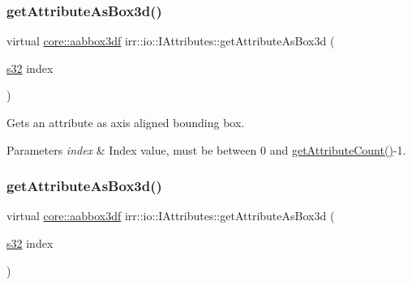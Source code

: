 \subsubsection{\texorpdfstring{get\+Attribute\+As\+Box3d()}{getAttributeAsBox3d()}\hspace{0.1cm}{\footnotesize\ttfamily [3/4]}}
{\footnotesize\ttfamily virtual \hyperlink{namespaceirr_1_1core_a60f4b4c744aba55f10530d503c6ecb04}{core\+::aabbox3df} irr\+::io\+::\+I\+Attributes\+::get\+Attribute\+As\+Box3d (\begin{DoxyParamCaption}\item[{\hyperlink{namespaceirr_ac66849b7a6ed16e30ebede579f9b47c6}{s32}}]{index }\end{DoxyParamCaption})\hspace{0.3cm}{\ttfamily [pure virtual]}}



Gets an attribute as axis aligned bounding box. 


\begin{DoxyParams}{Parameters}
{\em index} & Index value, must be between 0 and \hyperlink{classirr_1_1io_1_1IAttributes_a796bdd9440ee7ba0b6742a90a82870b6}{get\+Attribute\+Count()}-\/1. \\
\hline
\end{DoxyParams}
\mbox{\label{classirr_1_1io_1_1IAttributes_a3da2aafbf1bfe8bcdb7dfa2866a4efe4}} 
\subsubsection{\texorpdfstring{get\+Attribute\+As\+Box3d()}{getAttributeAsBox3d()}\hspace{0.1cm}{\footnotesize\ttfamily [4/4]}}
{\footnotesize\ttfamily virtual \hyperlink{namespaceirr_1_1core_a60f4b4c744aba55f10530d503c6ecb04}{core\+::aabbox3df} irr\+::io\+::\+I\+Attributes\+::get\+Attribute\+As\+Box3d (\begin{DoxyParamCaption}\item[{\hyperlink{namespaceirr_ac66849b7a6ed16e30ebede579f9b47c6}{s32}}]{index }\end{DoxyParamCaption})\hspace{0.3cm}{\ttfamily [pure virtual]}}



